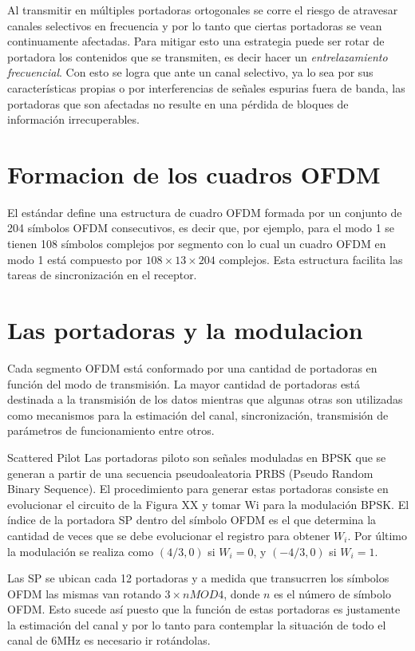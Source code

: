Al transmitir en m\'ultiples portadoras ortogonales se corre el riesgo de atravesar canales selectivos en frecuencia y por lo tanto que ciertas portadoras se vean continuamente afectadas. Para mitigar esto una estrategia puede ser rotar de portadora los contenidos que se transmiten, es decir hacer un \textit{entrelazamiento frecuencial}. Con esto se logra que ante un canal selectivo, ya lo sea por sus caracter\'isticas propias o por interferencias de señales espurias fuera de banda, las portadoras que son afectadas no resulte en una p\'erdida de bloques de informaci\'on irrecuperables.


\section{Formacion de los cuadros OFDM}

El estándar define una estructura de cuadro OFDM formada por un conjunto de 204 símbolos OFDM consecutivos, es decir que, por ejemplo, para el modo 1 se tienen 108 símbolos complejos por segmento con lo cual un cuadro OFDM en modo 1 está compuesto por $108 \times 13 \times 204$ complejos. Esta estructura facilita las tareas de sincronización en el receptor.


\section{Las portadoras y la modulacion}

Cada segmento OFDM está conformado por una cantidad de portadoras en función del modo de transmisión. La mayor cantidad de portadoras está destinada a la transmisión de los datos mientras que algunas otras son utilizadas como mecanismos para la estimación del canal, sincronización, transmisión de parámetros de funcionamiento entre otros.



Scattered Pilot
Las portadoras piloto son señales moduladas en BPSK que se generan a partir de una secuencia pseudoaleatoria PRBS (Pseudo Random Binary Sequence). El procedimiento para generar estas portadoras consiste en evolucionar el circuito de la Figura XX y tomar Wi para la modulación BPSK. El índice de la portadora SP dentro del símbolo OFDM es el que determina la cantidad de veces que se debe evolucionar el registro para obtener $W_i$.
Por último la modulación se realiza como $(4/3, 0)$ si $W_i = 0$, y $(-4/3, 0)$ si $W_i = 1$.

Las SP se ubican cada 12 portadoras y a medida que transucrren los símbolos OFDM las mismas van rotando $3 \times n MOD 4$, donde $n$ es el número de símbolo OFDM. Esto sucede así puesto que la función de estas portadoras es justamente la estimación del canal y por lo tanto para contemplar la situación de todo el canal de 6MHz es necesario ir rotándolas. 


